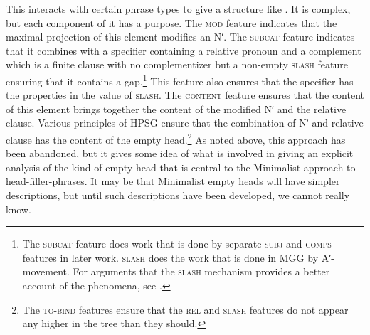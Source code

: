 \documentclass[output=paper]{langsci/langscibook}
\begin{document}
\ea\label{ex:borsley:4.8}
     \small
\z
%
This interacts with certain phrase types to give a structure like
. It is complex, but each component of it has a purpose. The \textsc{mod}
feature indicates that the maximal projection of this element modifies an Nʹ.
The \textsc{subcat} feature indicates that it combines with a specifier containing a
relative pronoun and a complement which is a finite clause with no
complementizer but a non-empty \textsc{slash} feature ensuring that it contains a
gap.\footnote{The \textsc{subcat} feature does work that is done by separate \textsc{subj} and
\textsc{comps} features in later work. \textsc{slash} does the work that is done in \gls{MGG} by
Aʹ-movement. For arguments that the \textsc{slash} mechanism provides a better account
of the phenomena, see \citet{Borsley2012}.} This feature also ensures that the
specifier has the properties in the value of \textsc{slash}. The \textsc{content} feature ensures
that the content of this element brings together the content of the modified Nʹ
and the relative clause. Various principles of \gls{HPSG} ensure that the
combination of Nʹ and relative clause has the content of the empty
head.\footnote{The \textsc{to-bind} features ensure that the \textsc{rel} and \textsc{slash} features do
not appear any higher in the tree than they should.} As noted above, this
approach has been abandoned, but it gives some idea of what is involved in
giving an explicit analysis of the kind of empty head that is central to the
Minimalist approach to head-filler-phrases.  It may be that Minimalist empty
heads will have simpler descriptions, but until such descriptions have been
developed, we cannot really know.
\end{document}
